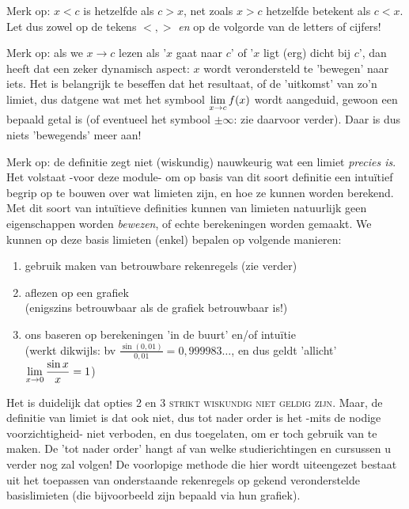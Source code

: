 \documentclass[numbers]{ximera}
\begin{document}
Merk op: $x<c$ is hetzelfde als  $c>x$, net zoals  $x>c$ hetzelfde betekent als $c<x$. Let dus zowel op de tekens $<,>$ \textit{en} op de volgorde van de letters of cijfers!  

Merk op: als we  $x\to c$ lezen als '$x$ gaat naar $c$' of '$x$ ligt (erg) dicht bij $c$', dan heeft dat een zeker dynamisch aspect: $x$ wordt verondersteld te 'bewegen' naar iets. Het is belangrijk te beseffen dat het resultaat, of de 'uitkomst' van zo'n limiet, dus datgene wat met het symbool $\limxc f(x)$ wordt aangeduid, gewoon een bepaald getal is (of eventueel het symbool $\pm\infty$: zie daarvoor verder). Daar is dus niets 'bewegends' meer aan!


Merk op: de definitie zegt niet (wiskundig) nauwkeurig wat een limiet \textit{precies is}. Het volstaat -voor deze module- om op basis van dit soort definitie een intuïtief begrip op te bouwen over wat limieten zijn, en hoe ze kunnen worden berekend. Met dit soort van intuïtieve definities kunnen van limieten natuurlijk geen eigenschappen worden \textit{bewezen}, of echte berekeningen worden gemaakt. We kunnen op deze basis limieten (enkel) bepalen op volgende manieren:
\begin{enumerate}
	\item gebruik maken van betrouwbare rekenregels (zie verder)
	\item aflezen op een grafiek  
	\\(enigszins betrouwbaar als de grafiek betrouwbaar is!)
	\item ons baseren op berekeningen 'in de buurt' en/of intuïtie 
	\\(werkt dikwijls: bv $\frac{\sin(0,01)}{0,01}=0,999983\dots$, en dus geldt 'allicht' $\limx \frac{\sin x}{x} = 1$)
\end{enumerate}
Het is duidelijk dat opties 2 en  3 \textsc{strikt wiskundig niet geldig zijn}. Maar, de definitie van limiet is dat ook niet, dus tot nader order is het -mits de nodige voorzichtigheid- niet verboden, en dus toegelaten, om er toch gebruik van te maken. De 'tot nader order' hangt af van welke studierichtingen en cursussen u verder nog zal volgen! De voorlopige methode die hier wordt uiteengezet bestaat uit het toepassen van onderstaande rekenregels op gekend veronderstelde basislimieten (die bijvoorbeeld zijn bepaald via hun grafiek). 
\end{document}
